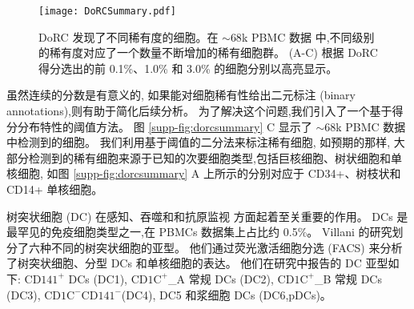 \begin{figure*}[!htbp]
    \centering
    \texttt{[image: DoRCSummary.pdf]}
    \caption{
    DoRC 发现了不同稀有度的细胞。在 ${\sim}68$k PBMC 数据  中,不同级别的稀有度对应了一个数量不断增加的稀有细胞群。
    (A-C) 根据 DoRC 得分选出的前 0.1\%、1.0\% 和 3.0\% 的细胞分别以高亮显示。    
    }
    \label{fig:dorcsummary}
\end{figure*}

虽然连续的分数是有意义的,
如果能对细胞稀有性给出二元标注 (binary annotations),则有助于简化后续分析。
为了解决这个问题,我们引入了一个基于得分分布特性的阈值方法。
图 \ref{supp-fig:dorcsummary} C 显示了 ${\sim}68$k PBMC 数据中检测到的细胞。
我们利用基于阈值的二分法来标注稀有细胞,
如预期的那样,
大部分检测到的稀有细胞来源于已知的次要细胞类型,包括巨核细胞、树状细胞和单核细胞,
如图 \ref{supp-fig:dorcsummary} A 上所示的分别对应于 CD34+、树枝状和 CD14+ 单核细胞。


树突状细胞 (DC) 在感知、吞噬和和抗原监视  方面起着至关重要的作用。
DCs 是最罕见的免疫细胞类型之一,在 PBMCs  数据集上占比约 0.5\%。
Villani  的研究划分了六种不同的树突状细胞的亚型。
他们通过荧光激活细胞分选 (FACS) 来分析了树突状细胞、分型 DCs 和单核细胞的表达。
他们在研究中报告的 DC 亚型如下:
$\text{CD141}^+$ DCs (DC1), 
$\text{CD1C}^+${\_}A 常规 DCs (DC2),
$\text{CD1C}^+${\_}B 常规 DCs (DC3),
$\text{CD1C}^-\text{CD141}^-$(DC4), DC5 和浆细胞 DCs (DC6,pDCs)。


